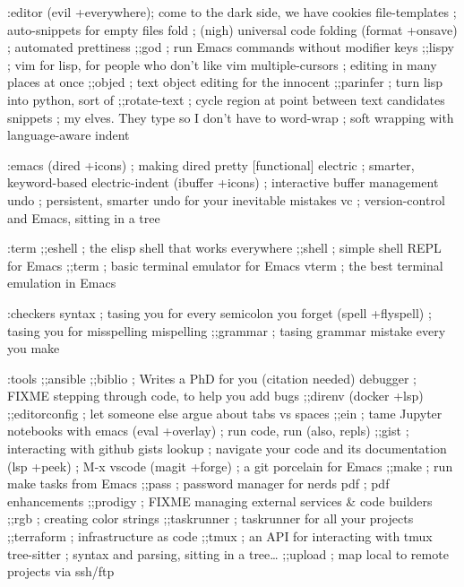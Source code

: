 \documentclass[11pt]{article}
\begin{document}
:editor
(evil +everywhere); come to the dark side, we have cookies
file-templates    ; auto-snippets for empty files
fold              ; (nigh) universal code folding
(format +onsave)  ; automated prettiness
;;god               ; run Emacs commands without modifier keys
;;lispy             ; vim for lisp, for people who don't like vim
multiple-cursors  ; editing in many places at once
;;objed             ; text object editing for the innocent
;;parinfer          ; turn lisp into python, sort of
;;rotate-text       ; cycle region at point between text candidates
snippets          ; my elves. They type so I don't have to
word-wrap         ; soft wrapping with language-aware indent

:emacs
(dired +icons)             ; making dired pretty [functional]
electric          ; smarter, keyword-based electric-indent
(ibuffer +icons)         ; interactive buffer management
undo              ; persistent, smarter undo for your inevitable mistakes
vc                ; version-control and Emacs, sitting in a tree

:term
;;eshell            ; the elisp shell that works everywhere
;;shell             ; simple shell REPL for Emacs
;;term              ; basic terminal emulator for Emacs
vterm             ; the best terminal emulation in Emacs

:checkers
syntax              ; tasing you for every semicolon you forget
(spell +flyspell) ; tasing you for misspelling mispelling
;;grammar           ; tasing grammar mistake every you make

:tools
;;ansible
;;biblio            ; Writes a PhD for you (citation needed)
debugger          ; FIXME stepping through code, to help you add bugs
;;direnv
(docker +lsp)
;;editorconfig      ; let someone else argue about tabs vs spaces
;;ein               ; tame Jupyter notebooks with emacs
(eval +overlay)     ; run code, run (also, repls)
;;gist              ; interacting with github gists
lookup              ; navigate your code and its documentation
(lsp +peek)               ; M-x vscode
(magit +forge)             ; a git porcelain for Emacs
;;make              ; run make tasks from Emacs
;;pass              ; password manager for nerds
pdf               ; pdf enhancements
;;prodigy           ; FIXME managing external services \& code builders
;;rgb               ; creating color strings
;;taskrunner        ; taskrunner for all your projects
;;terraform         ; infrastructure as code
;;tmux              ; an API for interacting with tmux
tree-sitter       ; syntax and parsing, sitting in a tree\ldots{}
;;upload            ; map local to remote projects via ssh/ftp
\end{document}
